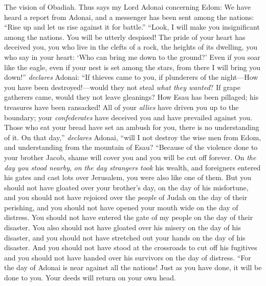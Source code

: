 
\begin{biblechapter} %
 The vision of Obadiah. Thus says my Lord Adonai concerning Edom:
 We have heard a report from Adonai, and a messenger has been sent among the nations: “Rise up and let us rise against it for battle.”
\verse “Look, I will make you insignificant among the nations. You will be utterly despised!
\verse The pride of your heart has deceived you, you who live in the clefts of a rock, the heights of its dwelling, you who say in your heart: ‘Who can bring me down to the ground?’
\verse Even if you soar like the eagle, even if your nest is set among the stars, from there I will bring you down!” \textit{declares} Adonai:
\verse “If thieves came to you, if plunderers of the night—How you have been destroyed!—would they not steal \textit{what they wanted}? If grape gatherers came, would they not leave gleanings?
\verse How Esau has been pillaged; his treasures have been ransacked!
\verse All of your \textit{allies} have driven you up to the boundary; your \textit{confederates} have deceived you and have prevailed against you. Those who eat your bread have set an ambush for you, there is no understanding of it.
\verse On that day,” \textit{declares} Adonai, “will I not destroy the wise men from Edom, and understanding from the mountain of Esau?
 “Because of the violence done to your brother Jacob, shame will cover you and you will be cut off forever.
\verse On \textit{the day you stood nearby}, \textit{on the day strangers took} his wealth, and foreigners entered his gates and cast lots over Jerusalem, you were also like one of them.
\verse But you should not have gloated over your brother’s day, on the day of his misfortune, and you should not have rejoiced over the \textit{people} of Judah on the day of their perishing, and you should not have opened your mouth wide on the day of distress.
\verse You should not have entered the gate of my people on the day of their disaster. You also should not have gloated over his misery on the day of his disaster, and you should not have stretched out your hands on the day of his disaster.
\verse And you should not have stood at the crossroads to cut off his fugitives and you should not have handed over his survivors on the day of distress.
 “For the day of Adonai is near against all the nations! Just as you have done, it will be done to you. Your deeds will return on your own head.

\end{biblechapter}
